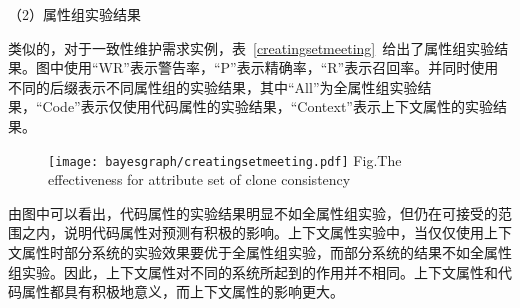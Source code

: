 （2）属性组实验结果

类似的，对于一致性维护需求实例，表~\ref{creatingsetmeeting}~给出了属性组实验结果。图中使用“WR”表示警告率，“P”表示精确率，“R”表示召回率。并同时使用不同的后缀表示不同属性组的实验结果，其中“All”为全属性组实验结果，“Code”表示仅使用代码属性的实验结果，“Context”表示上下文属性的实验结果。

\begin{figure}[h]
\centering
\texttt{[image: bayesgraph/creatingsetmeeting.pdf]}
{Fig.$\!$}{The effectiveness for attribute set of clone consistency}
\vspace{-1em}
\end{figure}



由图中可以看出，代码属性的实验结果明显不如全属性组实验，但仍在可接受的范围之内，说明代码属性对预测有积极的影响。上下文属性实验中，当仅仅使用上下文属性时部分系统的实验效果要优于全属性组实验，而部分系统的结果不如全属性组实验。因此，上下文属性对不同的系统所起到的作用并不相同。上下文属性和代码属性都具有积极地意义，而上下文属性的影响更大。


